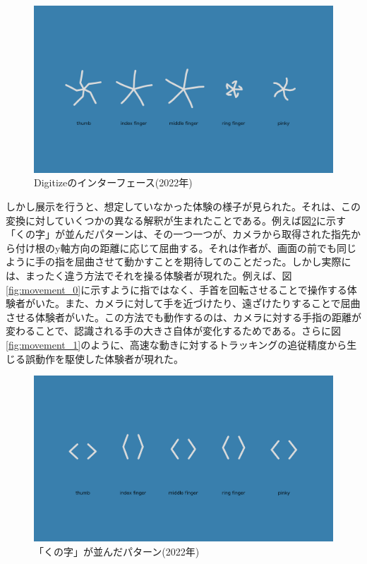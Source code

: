 \begin{figure}[H]
  \centering
  \includegraphics[width=15cm]{img/openhouse2022_interface.png}
  \caption{Digitizeのインターフェース(2022年)}
  \label{fig:exhibit_2022_interface}
\end{figure}

しかし展示を行うと、想定していなかった体験の様子が見られた。それは、この変換に対していくつかの異なる解釈が生まれたことである。例えば図\ref{fig:exhibit_2022_kunoji}に示す「くの字」が並んだパターンは、その一つ一つが、カメラから取得された指先から付け根のy軸方向の距離に応じて屈曲する。それは作者が、画面の前でも同じように手の指を屈曲させて動かすことを期待してのことだった。しかし実際には、まったく違う方法でそれを操る体験者が現れた。例えば、図\ref{fig:movement_0}に示すように指ではなく、手首を回転させることで操作する体験者がいた。また、カメラに対して手を近づけたり、遠ざけたりすることで屈曲させる体験者がいた。この方法でも動作するのは、カメラに対する手指の距離が変わることで、認識される手の大きさ自体が変化するためである。さらに図\ref{fig:movement_1}のように、高速な動きに対するトラッキングの追従精度から生じる誤動作を駆使した体験者が現れた。

\begin{figure}[H]
  \centering
  \includegraphics[width=15cm]{img/kunoji_2022.png}
  \caption{「くの字」が並んだパターン(2022年)}
  \label{fig:exhibit_2022_kunoji}
\end{figure}

